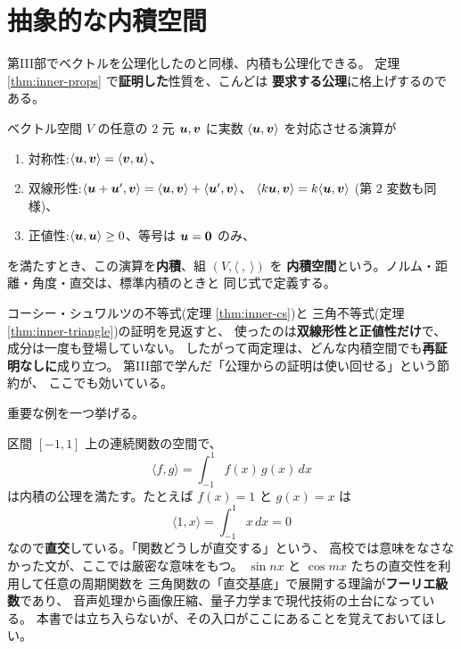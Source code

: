 \section{抽象的な内積空間}

第III部でベクトルを公理化したのと同様、内積も公理化できる。
定理 \ref{thm:inner-props} で\textbf{証明した}性質を、こんどは
\textbf{要求する公理}に格上げするのである。

\begin{teigi}[内積空間]\label{def:inner-axioms}
ベクトル空間 $V$ の任意の $2$ 元 $\bm{u}, \bm{v}$ に実数
$\langle \bm{u}, \bm{v} \rangle$ を対応させる演算が
\begin{enumerate}
\item 対称性:$\langle \bm{u}, \bm{v} \rangle = \langle \bm{v}, \bm{u} \rangle$、
\item 双線形性:$\langle \bm{u} + \bm{u}', \bm{v} \rangle
= \langle \bm{u}, \bm{v} \rangle + \langle \bm{u}', \bm{v} \rangle$、
$\langle k\bm{u}, \bm{v} \rangle = k\langle \bm{u}, \bm{v} \rangle$
(第 $2$ 変数も同様)、
\item 正値性:$\langle \bm{u}, \bm{u} \rangle \ge 0$、等号は
$\bm{u} = \bm{0}$ のみ、
\end{enumerate}
を満たすとき、この演算を\textbf{内積}、組 $(V, \langle\ ,\ \rangle)$ を
\textbf{内積空間}という。ノルム・距離・角度・直交は、標準内積のときと
同じ式で定義する。
\end{teigi}

\begin{chui}
コーシー・シュワルツの不等式(定理 \ref{thm:inner-cs})と
三角不等式(定理 \ref{thm:inner-triangle})の証明を見返すと、
使ったのは\textbf{双線形性と正値性だけ}で、成分は一度も登場していない。
したがって両定理は、どんな内積空間でも\textbf{再証明なしに}成り立つ。
第III部で学んだ「公理からの証明は使い回せる」という節約が、
ここでも効いている。
\end{chui}

重要な例を一つ挙げる。

\begin{rei}[関数の内積]\label{rei:inner-func}
区間 $[-1, 1]$ 上の連続関数の空間で、
\[
\langle f, g \rangle = \int_{-1}^{1} f(x)\,g(x)\,dx
\]
は内積の公理を満たす。たとえば $f(x) = 1$ と $g(x) = x$ は
\[
\langle 1, x \rangle = \int_{-1}^{1} x\,dx = 0
\]
なので\textbf{直交}している。「関数どうしが直交する」という、
高校では意味をなさなかった文が、ここでは厳密な意味をもつ。
$\sin nx$ と $\cos mx$ たちの直交性を利用して任意の周期関数を
三角関数の「直交基底」で展開する理論が\textbf{フーリエ級数}であり、
音声処理から画像圧縮、量子力学まで現代技術の土台になっている。
本書では立ち入らないが、その入口がここにあることを覚えておいてほしい。
\end{rei}

